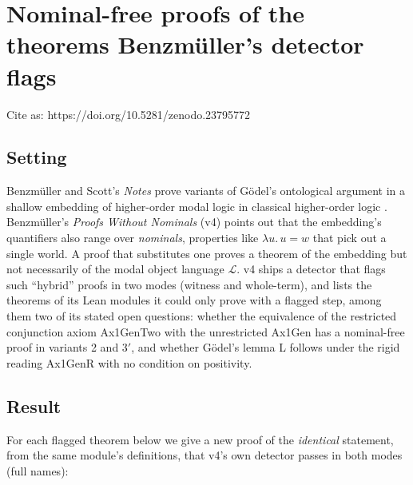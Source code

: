 \documentclass{article}
\begin{document}
\section{Nominal-free proofs of the theorems Benzmüller's detector flags}
\label{sec:ontological-nominal-free-proofs}

Cite as: https://doi.org/10.5281/zenodo.23795772

\subsection*{Setting}

Benzmüller and Scott's \emph{Notes} prove variants of Gödel's ontological argument in a shallow
embedding of higher-order modal logic in classical higher-order logic \cite{benzmueller2025notes}.
Benzmüller's \emph{Proofs Without Nominals} \cite{benzmueller2026nominals} (v4) points out that the
embedding's quantifiers also range over \emph{nominals}, properties like $\lambda u.\,u = w$ that pick
out a single world. A proof that substitutes one proves a theorem of the embedding but not
necessarily of the modal object language $\mathcal L$. v4 ships a detector that flags such
``hybrid'' proofs in two modes (witness and whole-term), and lists the theorems of its Lean
modules it could only prove with a flagged step, among them two of its stated open questions:
whether the equivalence of the restricted conjunction axiom Ax1GenTwo with the unrestricted
Ax1Gen has a nominal-free proof in variants 2 and 3$'$, and whether Gödel's lemma L follows under
the rigid reading Ax1GenR with no condition on positivity.

\subsection*{Result}

For each flagged theorem below we give a new proof of the \emph{identical} statement, from the same
module's definitions, that v4's own detector passes in both modes (full names):
\end{document}
